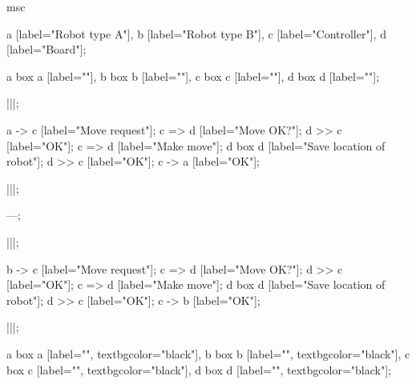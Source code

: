 \begin{msc}
msc
{

a [label="Robot type A"],
b [label="Robot type B"],
c [label="Controller"],
d [label="Board"];

a box a [label=""],
b box b [label=""],
c box c [label=""],
d box d [label=""];

|||;

a -> c [label="Move request"];
c => d [label="Move OK?"];
d >> c [label="OK"];
c => d [label="Make move"];
d box d [label="Save location of robot"];
d >> c [label="OK"];
c -> a [label="OK"];

|||;

---;

|||;

b -> c [label="Move request"];
c => d [label="Move OK?"];
d >> c [label="OK"];
c => d [label="Make move"];
d box d [label="Save location of robot"];
d >> c [label="OK"];
c -> b [label="OK"];

|||;

a box a [label="", textbgcolor="black"],
b box b [label="", textbgcolor="black"],
c box c [label="", textbgcolor="black"],
d box d [label="", textbgcolor="black"];

}
\end{msc}
